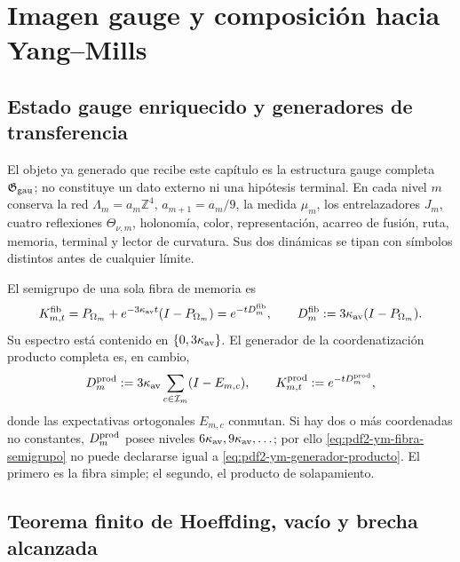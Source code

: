 \section{Imagen gauge y composición hacia Yang--Mills}

\subsection{Estado gauge enriquecido y generadores de transferencia}

El objeto ya generado que recibe este capítulo es la estructura gauge completa
$\mathfrak G_{\rm gau}$; no constituye un dato externo ni una hipótesis terminal.
En cada nivel $m$ conserva la red
$\Lambda_m=a_m\mathbb Z^4$, $a_{m+1}=a_m/9$, la medida $\mu_m$, los
entrelazadores $J_m$, cuatro reflexiones $\Theta_{\nu,m}$, holonomía, color,
representación, acarreo de fusión, ruta, memoria, terminal y lector de curvatura.
Sus dos dinámicas se tipan con símbolos distintos antes de cualquier límite.

El semigrupo de una sola fibra de memoria es
\begin{equation}\label{eq:pdf2-ym-fibra-semigrupo}
 K^{\rm fib}_{m,t}
 =P_{\Omega_m}+e^{-3\kappa_{\rm av}t}(I-P_{\Omega_m})
 =e^{-tD_m^{\rm fib}},
 \qquad
 D_m^{\rm fib}:=3\kappa_{\rm av}(I-P_{\Omega_m}).
\end{equation}
Su espectro está contenido en $\{0,3\kappa_{\rm av}\}$. El generador de la
coordenatización producto completa es, en cambio,
\begin{equation}\label{eq:pdf2-ym-generador-producto}
 D_m^{\rm prod}:=3\kappa_{\rm av}
 \sum_{c\in\mathcal I_m}(I-E_{m,c}),
 \qquad
 K^{\rm prod}_{m,t}:=e^{-tD_m^{\rm prod}},
\end{equation}
donde las expectativas ortogonales $E_{m,c}$ conmutan. Si hay dos o más
coordenadas no constantes, $D_m^{\rm prod}$ posee niveles
$6\kappa_{\rm av},9\kappa_{\rm av},\ldots$; por ello
\eqref{eq:pdf2-ym-fibra-semigrupo} no puede declararse igual a
\eqref{eq:pdf2-ym-generador-producto}. El primero es la fibra simple; el segundo,
el producto de solapamiento.

\subsection{Teorema finito de Hoeffding, vacío y brecha alcanzada}

